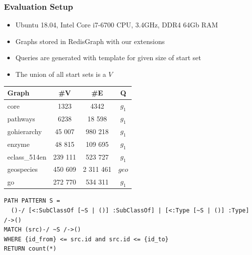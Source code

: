\documentclass[xcolor=table,aspectratio=169]{beamer}
\begin{document}
\begin{frame}[fragile] \frametitle{Evaluation Setup}

\begin{minipage}[t]{0.51\textwidth}
\vspace{-2cm}
\begin{itemize}
  \item Ubuntu 18.04, Intel Core i7-6700 CPU, 3.4GHz, DDR4 64Gb RAM
  \item Graphs stored in RedisGraph with our extensions
  \item Queries are generated with template for given size of start set
  \item The union of all start sets is a $V$ 
\end{itemize}

\end{minipage}
\pause
\begin{minipage}[t]{0.44\textwidth}
{
\begin{tabular}{|l|c|c|c|}
\hline
Graph                  & \#V                  & \#E                  & Q     \\
              
\hline
\hline
core                   & 1323                 & 4342                 & $g_1$ \\
pathways               & 6238                 & 18 598               & $g_1$ \\
gohierarchy            & 45 007               & 980 218              & $g_1$ \\
enzyme                 & 48 815               & 109 695              & $g_1$ \\
eclass\_514en          & 239 111              & 523 727              & $g_1$ \\
geospecies             & 450 609              & 2 311 461            & $geo$ \\
go                     & 272 770              & 534 311              & $g_1$ \\
\hline
\end{tabular}
}

\end{minipage}

\vspace{1cm}
\pause
\begin{verbatim}
PATH PATTERN S = 
  ()-/ [<:SubClassOf [~S | ()] :SubClassOf] | [<:Type [~S | ()] :Type] /->()
MATCH (src)-/ ~S /->()
WHERE {id_from} <= src.id and src.id <= {id_to}
RETURN count(*)

\end{verbatim}


\end{frame}
\end{document}
